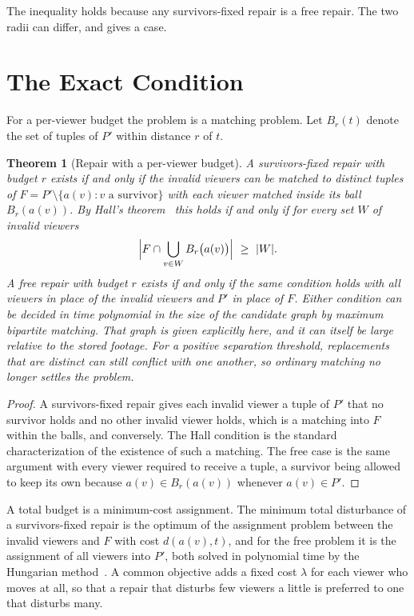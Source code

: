 \documentclass[11pt,twoside,openright]{book}
\theoremstyle{plain}
\newtheorem{theorem}{Theorem}[chapter]
\theoremstyle{definition}
\theoremstyle{remark}
\begin{document}
The inequality holds because any survivors-fixed repair is a free repair. The two radii can differ, and  gives a case.

\section{The Exact Condition}\label{sec:hall}

For a per-viewer budget the problem is a matching problem. Let $B_r(t)$ denote the set of tuples of $P'$ within distance $r$ of $t$.

\begin{theorem}[Repair with a per-viewer budget]\label{thm:repair}
A survivors-fixed repair with budget $r$ exists if and only if the invalid viewers can be matched to distinct tuples of $F=P'\setminus\{a(v):v\text{ a survivor}\}$ with each viewer matched inside its ball $B_r(a(v))$. By Hall's theorem~\cite{hall1935} this holds if and only if for every set $W$ of invalid viewers
\[
\Bigl\lvert F\cap\bigcup_{v\in W}B_r\bigl(a(v)\bigr)\Bigr\rvert\ \ge\ \lvert W\rvert .
\]
A free repair with budget $r$ exists if and only if the same condition holds with all viewers in place of the invalid viewers and $P'$ in place of $F$. Either condition can be decided in time polynomial in the size of the candidate graph by maximum bipartite matching. That graph is given explicitly here, and it can itself be large relative to the stored footage. For a positive separation threshold, replacements that are distinct can still conflict with one another, so ordinary matching no longer settles the problem.
\end{theorem}

\begin{proof}
A survivors-fixed repair gives each invalid viewer a tuple of $P'$ that no survivor holds and no other invalid viewer holds, which is a matching into $F$ within the balls, and conversely. The Hall condition is the standard characterization of the existence of such a matching. The free case is the same argument with every viewer required to receive a tuple, a survivor being allowed to keep its own because $a(v)\in B_r(a(v))$ whenever $a(v)\in P'$.
\end{proof}

A total budget is a minimum-cost assignment. The minimum total disturbance of a survivors-fixed repair is the optimum of the assignment problem between the invalid viewers and $F$ with cost $d(a(v),t)$, and for the free problem it is the assignment of all viewers into $P'$, both solved in polynomial time by the Hungarian method~\cite{kuhn1955}. A common objective adds a fixed cost $\lambda$ for each viewer who moves at all, so that a repair that disturbs few viewers a little is preferred to one that disturbs many.
\end{document}
